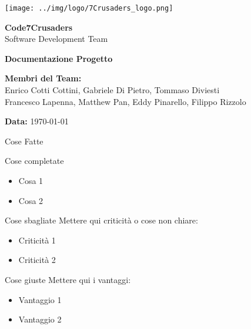 \documentclass{beamer}
\begin{document}
\begin{frame}[plain] %
    \centering
    \vspace*{2cm}
    
    \texttt{[image: ../img/logo/7Crusaders\_logo.png]} %
    \vspace{1cm}
    
    {\Huge \textbf{Code7Crusaders}}\\
    \vspace{0.5cm}
    {\Large Software Development Team}\\
    \vspace{2cm}
    
    {\large \textbf{Documentazione Progetto}}\\
    \vspace{3cm}

    \textbf{Membri del Team:}\\
    Enrico Cotti Cottini, Gabriele Di Pietro, Tommaso Diviesti \\
    Francesco Lapenna, Matthew Pan, Eddy Pinarello, Filippo Rizzolo \\
    \vspace{1cm}
    
    {\large \textbf{Data:}} \today\\
    
    \vspace{1cm}
\end{frame}


\begin{frame}{Cose Fatte}
    \begin{block}{Cose completate}
        \begin{itemize}
            \item Cosa 1
            \item Cosa 2
        \end{itemize}
    \end{block}

    \begin{alertblock}{Cose sbagliate}
        Mettere qui criticità o cose non chiare:
        \begin{itemize}
            \item Criticità 1
            \item Criticità 2
        \end{itemize}
    \end{alertblock}

    \begin{exampleblock}{Cose giuste}
        Mettere qui i vantaggi:
        \begin{itemize}
            \item Vantaggio 1
            \item Vantaggio 2
        \end{itemize}
    \end{exampleblock}
\end{frame}
\end{document}
